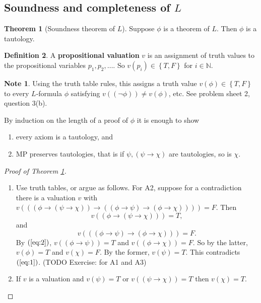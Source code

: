 \documentclass{article}
\newcommand{\N}{\mathbb{N}}
\newcommand{\rb}[1]{\left( #1 \right)}
\newcommand{\cb}[1]{\left\{ #1 \right\}}
\newcommand{\notb}[1]{\rb{\neg #1}}
\newcommand{\impb}[2]{\rb{#1 \rightarrow #2}}
\theoremstyle{definition}\newtheorem{definition}{Definition}[subsection]
\theoremstyle{definition}\newtheorem{remark}[definition]{Remark}
\theoremstyle{definition}\newtheorem*{example}{Example}
\theoremstyle{definition}\newtheorem*{note}{Note}
\newtheorem{theorem}[definition]{Theorem}
\begin{document}

\subsection{Soundness and completeness of $ L $}

\begin{theorem}[Soundness theorem of $ L $]
\label{thm:1.3.1}
Suppose $ \phi $ is a theorem of $ L $. Then $ \phi $ is a tautology.
\end{theorem}

\begin{definition}
A \textbf{propositional valuation} $ v $ is an assignment of truth values to the propositional variables $ p_1, p_2, \dots $. So $ v\rb{p_i} \in \cb{T, F} $ for $ i \in \N $.
\end{definition}

\begin{note}
Using the truth table rules, this assigns a truth value $ v\rb{\phi} \in \cb{T, F} $ to every $ L $-formula $ \phi $ satisfying $ v\rb{\notb{\phi}} \ne v\rb{\phi} $, etc. See problem sheet 2, question 3(b).
\end{note}

By induction on the length of a proof of $ \phi $ it is enough to show
\begin{enumerate}
\item every axiom is a tautology, and
\item MP preserves tautologies, that is if $ \psi, \impb{\psi}{\chi} $ are tautologies, so is $ \chi $.
\end{enumerate}

\begin{proof}[Proof of Theorem \ref{thm:1.3.1}]
\hfill
\begin{enumerate}
\item Use truth tables, or argue as follows. For A2, suppose for a contradiction there is a valuation $ v $ with $ v\rb{\impb{\impb{\phi}{\impb{\psi}{\chi}}}{\impb{\impb{\phi}{\psi}}{\impb{\phi}{\chi}}}} = F $. Then
\begin{equation}
\label{eq:1}
v\rb{\impb{\phi}{\impb{\psi}{\chi}}} = T,
\end{equation}
and
\begin{equation}
\label{eq:2}
v\rb{\impb{\impb{\phi}{\psi}}{\impb{\phi}{\chi}}} = F.
\end{equation}
By $ \rb{\ref{eq:2}} $, $ v\rb{\impb{\phi}{\psi}} = T $ and $ v\rb{\impb{\phi}{\chi}} = F $. So by the latter, $ v\rb{\phi} = T $ and $ v\rb{\chi} = F $. By the former, $ v\rb{\psi} = T $. This contradicts $ \rb{\ref{eq:1}} $. (TODO Exercise: for A1 and A3)
\item If $ v $ is a valuation and $ v\rb{\psi} = T $ or $ v\rb{\impb{\psi}{\chi}} = T $ then $ v\rb{\chi} = T $.
\end{enumerate}
\end{proof}
\end{document}
